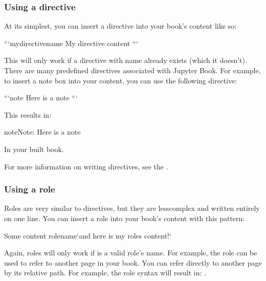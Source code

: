 \documentclass[letterpaper,10pt,english]{sphinxmanual}
\begin{document}
\subsubsection{Using a directive}
\label{\detokenize{markdown:using-a-directive}}
At its simplest, you can insert a directive into your book’s content like so:

\begin{sphinxVerbatim}[commandchars=\\\{\}]
```\PYGZob{}mydirectivename\PYGZcb{}
My directive content
```
\end{sphinxVerbatim}

This will only work if a directive with name  already exists
(which it doesn’t). There are many pre\sphinxhyphen{}defined directives associated with
Jupyter Book. For example, to insert a note box into your content, you can
use the following directive:

\begin{sphinxVerbatim}[commandchars=\\\{\}]
```\PYGZob{}note\PYGZcb{}
Here is a note
```
\end{sphinxVerbatim}

This results in:

\begin{sphinxadmonition}{note}{Note:}
Here is a note
\end{sphinxadmonition}

In your built book.

For more information on writing directives, see the
.


\subsubsection{Using a role}
\label{\detokenize{markdown:using-a-role}}
Roles are very similar to directives, but they are less\sphinxhyphen{}complex and written
entirely on one line. You can insert a role into your book’s content with
this pattern:

\begin{sphinxVerbatim}[commandchars=\\\{\}]
Some content \PYGZob{}rolename\PYGZcb{}`and here is my role\PYGZsq{}s content!`
\end{sphinxVerbatim}

Again, roles will only work if  is a valid role’s name. For example,
the  role can be used to refer to another page in your book. You can
refer directly to another page by its relative path. For example, the
role syntax  will result in: {\hyperref[\detokenize{intro::doc}]{}}.
\end{document}
